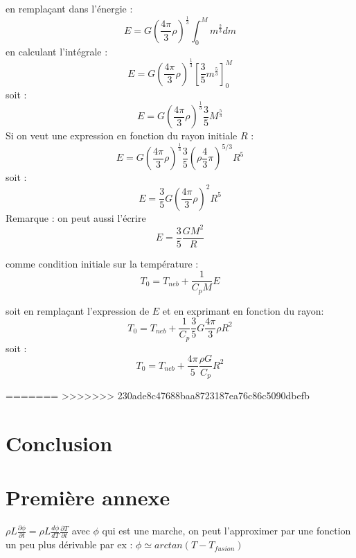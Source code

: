 \documentclass[10pt,a4paper]{article}
\numberwithin{equation}{section}
\begin{document}
en remplaçant dans l'énergie :
$$E=G\left(\frac{4\pi}{3}\rho\right)^\frac{1}{3}\int_0^M m^\frac{2}{3}dm$$
en calculant l'intégrale :
$$E=G\left(\frac{4\pi}{3}\rho\right)^\frac{1}{3}\left[\frac{3}{5} m^\frac{5}{3}\right]_0^M$$
soit :
$$E=G\left(\frac{4\pi}{3}\rho\right)^\frac{1}{3}\frac{3}{5} M^\frac{5}{3}$$
Si on veut une expression en fonction du rayon initiale $R$ :
$$E=G\left(\frac{4\pi}{3}\rho\right)^\frac{1}{3}\frac{3}{5} \left(\rho\frac{4}{3}\pi\right)^{5/3}R^5$$
soit :
$$E=\frac{3}{5}G\left(\frac{4\pi}{3}\rho\right)^2 R^5$$
Remarque : on peut aussi l'écrire
$$ E = \frac{3}{5} \frac{GM^2}{R}$$

comme condition initiale sur la température :
$$T_0=T_{neb} + \frac{1}{C_p M} E$$

soit en remplaçant l'expression de $E$ et en exprimant en fonction du rayon:
$$T_0 = T_{neb} + \frac{1}{C_p} \frac{3}{5}G\frac{4\pi}{3}\rho R^2$$
soit :
$$T_0 = T_{neb} + \frac{4\pi}{5}\frac{\rho G}{C_p} R^2$$


=======
>>>>>>> 230ade8c47688baa8723187ea76c86c5090dbefb


\section*{Conclusion}






\newpage
\appendix
\section{Première annexe} \label{annexe_fonctionnelles}
$ \rho L \frac{\partial \phi}{\partial t} = \rho L \frac{d \phi}{d T}\frac{\partial T}{\partial t} $ avec $\phi$ qui est une marche, on peut l'approximer par une fonction un peu plus dérivable par ex :  $\phi \simeq arctan(T-T_{fusion})$ 
\end{document}
